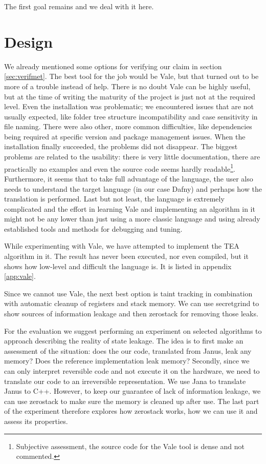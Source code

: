 \documentclass[a4paper,10pt,openright]{memoir}
\begin{document}
The first goal remains and we deal with it here.

\section{Design}
\label{sec:eval:design}

We already mentioned some options for verifying our claim in section 
\ref{sec:verifmet}. The best tool for the job would be Vale, but that 
turned out to be more of a trouble instead of help. There is no doubt 
Vale can be highly useful, but at the time of writing the maturity of 
the project is just not at the required level. Even the installation 
was problematic; we encountered issues that are not usually expected, 
like folder tree structure incompatibility and case sensitivity in file 
naming. There were also other, more common difficulties, like 
dependencies being required at specific version and package management 
issues. When the installation finally succeeded, the problems did not 
disappear. The biggest problems are related to the usability: there is 
very little documentation, there are practically no examples and even 
the source code seems hardly readable\footnote{Subjective assessment, 
the source code for the Vale tool is dense and not commented.}. 
Furthermore, it seems that to take full advantage of the language, the 
user also needs to understand the target language (in our case Dafny) 
and perhaps how the translation is performed. Last but not least, the 
language is extremely complicated and the effort in learning Vale and 
implementing an algorithm in it might not be any lower than just using 
a more classic language and using already established tools and methods 
for debugging and tuning.

While experimenting with Vale, we have attempted to implement the TEA 
algorithm in it. The result has never been executed, nor even compiled, 
but it shows how low-level and difficult the language is. It is listed 
in appendix \ref{app:vale}.

Since we cannot use Vale, the next best option is taint tracking in 
combination with automatic cleanup of registers and stack memory. We 
can use secretgrind to show sources of information leakage and then 
zerostack for removing those leaks.

For the evaluation we suggest performing an experiment on selected 
algorithms to approach describing the reality of state leakage. The 
idea is to first make an assessment of the situation: does the our 
code, translated from Janus, leak any memory? Does the reference 
implementation leak memory? Secondly, since we can only interpret 
reversible code and not execute it on the hardware, we need to 
translate our code to an irreversible representation. We use Jana to 
translate Janus to C++. However, to keep our guarantee of lack of 
information leakage, we can use zerostack to make sure the memory is 
cleaned up after use. The last part of the experiment therefore 
explores how zerostack works, how we can use it and assess its 
properties.
\end{document}
